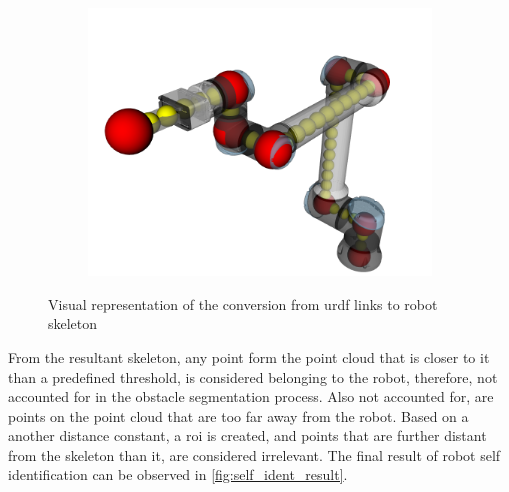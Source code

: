 \begin{figure}[h]
\begin{subfigure}{.33\linewidth}
        \includegraphics[width=.95\linewidth]{figs/chp4/self_ident_skeleton.png}
    \end{subfigure}
    \caption{Visual representation of the conversion from \ac{urdf} links to robot skeleton}
    \label{fig:links_to_points}
\end{figure}

\par From the resultant skeleton, any point form the point cloud that is closer to it than a predefined threshold, is considered belonging to the robot, therefore, not accounted for in the obstacle segmentation process. Also not accounted for, are points on the point cloud that are too far away from the robot. Based on a another distance constant, a \ac{roi} is created, and points that are further distant from the skeleton than it, are considered irrelevant. The final result of robot self identification can be observed in \autoref{fig:self_ident_result}.

